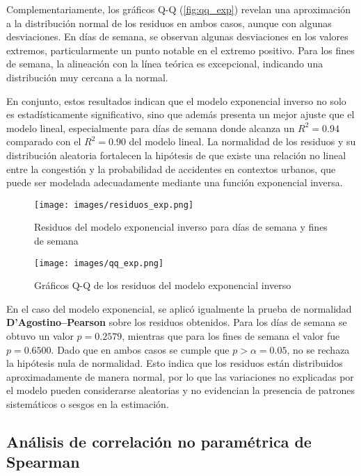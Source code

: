 \documentclass[12pt]{article}
\begin{document}
Complementariamente, los gráficos Q-Q (\autoref{fig:qq_exp}) revelan una aproximación a la distribución normal de los residuos en ambos casos, aunque con algunas desviaciones. En días de semana, se observan algunas desviaciones en los valores extremos, particularmente un punto notable en el extremo positivo. Para los fines de semana, la alineación con la línea teórica es excepcional, indicando una distribución muy cercana a la normal.

En conjunto, estos resultados indican que el modelo exponencial inverso no solo es estadísticamente significativo, sino que además presenta un mejor ajuste que el modelo lineal, especialmente para días de semana donde alcanza un $R^2 = 0.94$ comparado con el $R^2 = 0.90$ del modelo lineal. La normalidad de los residuos y su distribución aleatoria fortalecen la hipótesis de que existe una relación no lineal entre la congestión y la probabilidad de accidentes en contextos urbanos, que puede ser modelada adecuadamente mediante una función exponencial inversa.


\begin{figure}[H]
\centering
\texttt{[image: images/residuos\_exp.png]}
\caption{Residuos del modelo exponencial inverso para días de semana y fines de semana}
\label{fig:resid_exp}
\end{figure}

\begin{figure}[H]
\centering
\texttt{[image: images/qq\_exp.png]}
\caption{Gráficos Q-Q de los residuos del modelo exponencial inverso}
\label{fig:qq_exp}
\end{figure}

En el caso del modelo exponencial, se aplicó igualmente la prueba de normalidad \textbf{D'Agostino–Pearson} sobre los residuos obtenidos. Para los días de semana se obtuvo un valor $p = 0.2579$, mientras que para los fines de semana el valor fue $p = 0.6500$. Dado que en ambos casos se cumple que $p > \alpha = 0.05$, no se rechaza la hipótesis nula de normalidad. Esto indica que los residuos están distribuidos aproximadamente de manera normal, por lo que las variaciones no explicadas por el modelo pueden considerarse aleatorias y no evidencian la presencia de patrones sistemáticos o sesgos en la estimación.


\subsection{Análisis de correlación no paramétrica de Spearman}
\end{document}

